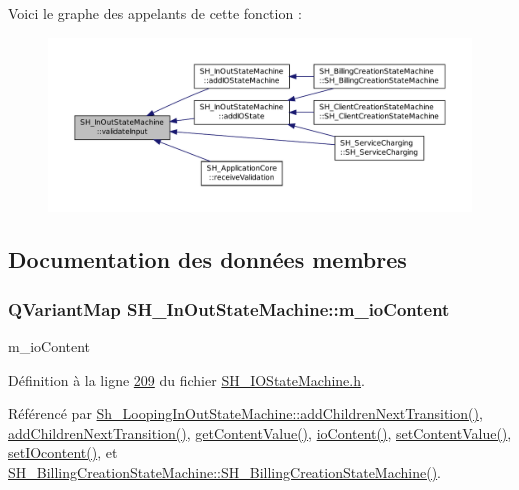 Voici le graphe des appelants de cette fonction \-:\nopagebreak
\begin{figure}[H]
\begin{center}
\leavevmode
\includegraphics[width=350pt]{classSH__InOutStateMachine_a5a5804bd32a04d25926f6e323b906887_icgraph}
\end{center}
\end{figure}




\subsection{Documentation des données membres}
\hypertarget{classSH__InOutStateMachine_a661a1c7bd3b1086b3b5cd60ca957ecbd}{
\subsubsection[{m\-\_\-io\-Content}]{\setlength{\rightskip}{0pt plus 5cm}Q\-Variant\-Map S\-H\-\_\-\-In\-Out\-State\-Machine\-::m\-\_\-io\-Content\hspace{0.3cm}{\ttfamily [protected]}}}\label{classSH__InOutStateMachine_a661a1c7bd3b1086b3b5cd60ca957ecbd}


m\-\_\-io\-Content 



Définition à la ligne \hyperlink{SH__IOStateMachine_8h_source_l00209}{209} du fichier \hyperlink{SH__IOStateMachine_8h_source}{S\-H\-\_\-\-I\-O\-State\-Machine.\-h}.



Référencé par \hyperlink{classSh__LoopingInOutStateMachine_acfd8d0711c793b13c759f6c50be6a315}{Sh\-\_\-\-Looping\-In\-Out\-State\-Machine\-::add\-Children\-Next\-Transition()}, \hyperlink{classSH__InOutStateMachine_a689e5513ef6ef3fc1598efacd413372e}{add\-Children\-Next\-Transition()}, \hyperlink{classSH__InOutStateMachine_a2cdd914f1e597ac52d021106eec75c89}{get\-Content\-Value()}, \hyperlink{classSH__InOutStateMachine_a79b456cb2e353cb61ef9fe19c97fc8fb}{io\-Content()}, \hyperlink{classSH__InOutStateMachine_aa2766b7a7ba39c35a10df7fc0c151b4f}{set\-Content\-Value()}, \hyperlink{classSH__InOutStateMachine_a23a925522339132a51d16a7cff9074b9}{set\-I\-Ocontent()}, et \hyperlink{classSH__BillingCreationStateMachine_ad62b77fa4aeafe200056ff3974562f83}{S\-H\-\_\-\-Billing\-Creation\-State\-Machine\-::\-S\-H\-\_\-\-Billing\-Creation\-State\-Machine()}.

